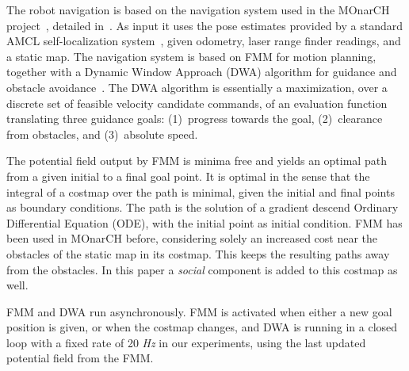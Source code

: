 The robot navigation is based on the navigation system used in the MOnarCH project~\cite{monarch2013}, detailed in~\cite{ventura2015}. As input it uses the pose estimates provided by a standard AMCL self-localization system~\cite{amcl}, given odometry, laser range finder readings, and a static map. The navigation system is based on FMM for motion planning, together with a Dynamic Window Approach (DWA) algorithm for guidance and obstacle avoidance~\cite{fox1997dynamic}. The DWA algorithm is essentially a maximization, over a discrete set of feasible velocity candidate commands, of an evaluation function translating three guidance goals: (1)~progress towards the goal, (2)~clearance from obstacles, and (3)~absolute speed.

The potential field output by FMM is minima free and yields an optimal path from a given initial to a final goal point. It is optimal in the sense that the integral of a costmap over the path is minimal, given the initial and final points as boundary conditions. The path is the solution of a gradient descend Ordinary Differential Equation (ODE), with the initial point as initial condition. FMM has been used in MOnarCH before, considering solely an increased cost near the obstacles of the static map in its costmap. This keeps the resulting paths away from the obstacles. In this paper a \emph{social} component is added to this costmap as well.%

FMM and DWA run asynchronously. FMM is activated when either a new goal position is given, or when the costmap changes, and DWA is running in a closed loop with a fixed rate of 20 \textit{Hz} in our experiments, using the last updated potential field from the FMM.


